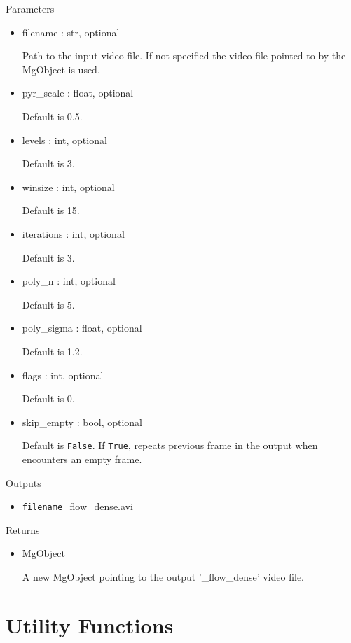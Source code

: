 \documentclass[9pt]{extarticle}
\def\code#1{\texttt{#1}}
\begin{document}
\noindent Parameters
\begin{itemize}
\item filename : str, optional

Path to the input video file. If not specified the video file 
pointed to by the MgObject is used.

\item pyr\_scale : float, optional

Default is 0.5.

\item levels : int, optional

Default is 3.

\item winsize : int, optional

Default is 15.

\item iterations : int, optional

Default is 3.

\item poly\_n : int, optional

Default is 5.

\item poly\_sigma : float, optional

Default is 1.2.

\item flags : int, optional

Default is 0.

\item skip\_empty : bool, optional

Default is \code{False}. If \code{True}, repeats previous frame 
in the output when encounters an empty frame.
\end{itemize}

\noindent Outputs
\begin{itemize}
\item \code{filename}\_flow\_dense.avi
\end{itemize}

\noindent Returns
\begin{itemize}
\item MgObject

A new MgObject pointing to the output '\_flow\_dense' video file.
\end{itemize}



\section{Utility Functions}
\end{document}
